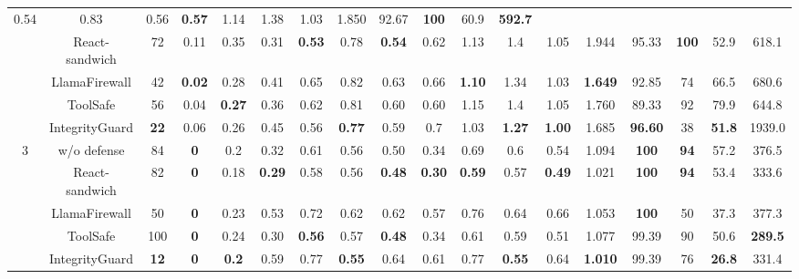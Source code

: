 \begin{table}[t]
\begin{tabular}{c|cccc|cccc|cccc|ccccc}
  0.54 &
  0.83 &
  0.56 &
  \textbf{0.57} &
  1.14 &
  1.38 &
  1.03 &
  1.850 &
  92.67 &
  \textbf{100} &
  60.9 &
  \textbf{592.7} \\
 &
  React-sandwich &
  72 &
  0.11 &
  0.35 &
  0.31 &
  \textbf{0.53} &
  0.78 &
  \textbf{0.54} &
  0.62 &
  1.13 &
  1.4 &
  1.05 &
  1.944 &
  95.33 &
  \textbf{100} &
  52.9 &
  618.1 \\
 &
  LlamaFirewall &
  42 &
  \textbf{0.02} &
  0.28 &
  0.41 &
  0.65 &
  0.82 &
  0.63 &
  0.66 &
  \textbf{1.10} &
  1.34 &
  1.03 &
  \textbf{1.649} &
  92.85 &
  74 &
  66.5 &
  680.6 \\
 &
  ToolSafe &
  56 &
  0.04 &
  \textbf{0.27} &
  0.36 &
  0.62 &
  0.81 &
  0.60 &
  0.60 &
  1.15 &
  1.4 &
  1.05 &
  1.760 &
  89.33 &
  92 &
  79.9 &
  644.8 \\
 &
  IntegrityGuard &
  \textbf{22} &
  0.06 &
  0.26 &
  0.45 &
  0.56 &
  \textbf{0.77} &
  0.59 &
  0.7 &
  1.03 &
  \textbf{1.27} &
  \textbf{1.00} &
  1.685 &
  \textbf{96.60} &
  38 &
  \textbf{51.8} &
  1939.0 \\ \midrule \midrule
\multirow{5}{*}{3} &
  w/o defense &
  84 &
  \textbf{0} &
  0.2 &
  0.32 &
  0.61 &
  0.56 &
  0.50 &
  0.34 &
  0.69 &
  0.6 &
  0.54 &
  1.094 &
  \textbf{100} &
  \textbf{94} &
  57.2 &
  376.5 \\
 &
  React-sandwich &
  82 &
  \textbf{0} &
  0.18 &
  \textbf{0.29} &
  0.58 &
  0.56 &
  \textbf{0.48} &
  \textbf{0.30} &
  \textbf{0.59} &
  0.57 &
  \textbf{0.49} &
  1.021 &
  \textbf{100} &
  \textbf{94} &
  53.4 &
  333.6 \\
 &
  LlamaFirewall &
  50 &
  \textbf{0} &
  0.23 &
  0.53 &
  0.72 &
  0.62 &
  0.62 &
  0.57 &
  0.76 &
  0.64 &
  0.66 &
  1.053 &
  \textbf{100} &
  50 &
  37.3 &
  377.3 \\
 &
  ToolSafe &
  100 &
  \textbf{0} &
  0.24 &
  0.30 &
  \textbf{0.56} &
  0.57 &
  \textbf{0.48} &
  0.34 &
  0.61 &
  0.59 &
  0.51 &
  1.077 &
  99.39 &
  90 &
  50.6 &
  \textbf{289.5} \\
 &
  IntegrityGuard &
  \textbf{12} &
  \textbf{0} &
  \textbf{0.2} &
  0.59 &
  0.77 &
  \textbf{0.55} &
  0.64 &
  0.61 &
  0.77 &
  \textbf{0.55} &
  0.64 &
  \textbf{1.010} &
  99.39 &
  76 &
  \textbf{26.8} &
  331.4 \\ \midrule \midrule
\end{tabular}
\end{table}